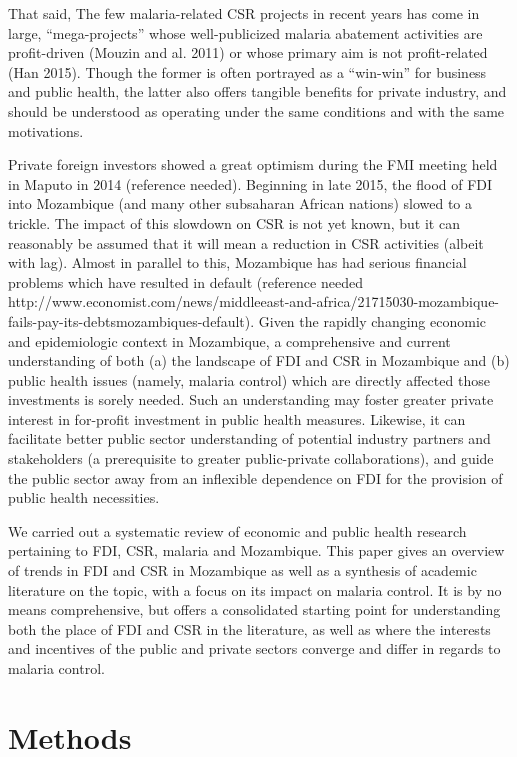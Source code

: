 \documentclass[]{elsarticle} %
\begin{document}
That said, The few malaria-related CSR projects in recent years has come
in large, ``mega-projects'' whose well-publicized malaria abatement
activities are profit-driven (Mouzin and al. 2011) or whose primary aim
is not profit-related (Han 2015). Though the former is often portrayed
as a ``win-win'' for business and public health, the latter also offers
tangible benefits for private industry, and should be understood as
operating under the same conditions and with the same motivations.

Private foreign investors showed a great optimism during the FMI meeting
held in Maputo in 2014 (reference needed). Beginning in late 2015, the
flood of FDI into Mozambique (and many other subsaharan African nations)
slowed to a trickle. The impact of this slowdown on CSR is not yet
known, but it can reasonably be assumed that it will mean a reduction in
CSR activities (albeit with lag). Almost in parallel to this, Mozambique
has had serious financial problems which have resulted in default
(reference needed
http://www.economist.com/news/middleeast-and-africa/21715030-mozambique-fails-pay-its-debtsmozambiques-default).
Given the rapidly changing economic and epidemiologic context in
Mozambique, a comprehensive and current understanding of both (a) the
landscape of FDI and CSR in Mozambique and (b) public health issues
(namely, malaria control) which are directly affected those investments
is sorely needed. Such an understanding may foster greater private
interest in for-profit investment in public health measures. Likewise,
it can facilitate better public sector understanding of potential
industry partners and stakeholders (a prerequisite to greater
public-private collaborations), and guide the public sector away from an
inflexible dependence on FDI for the provision of public health
necessities.

We carried out a systematic review of economic and public health
research pertaining to FDI, CSR, malaria and Mozambique. This paper
gives an overview of trends in FDI and CSR in Mozambique as well as a
synthesis of academic literature on the topic, with a focus on its
impact on malaria control. It is by no means comprehensive, but offers a
consolidated starting point for understanding both the place of FDI and
CSR in the literature, as well as where the interests and incentives of
the public and private sectors converge and differ in regards to malaria
control.

\section{Methods}\label{methods}
\end{document}
